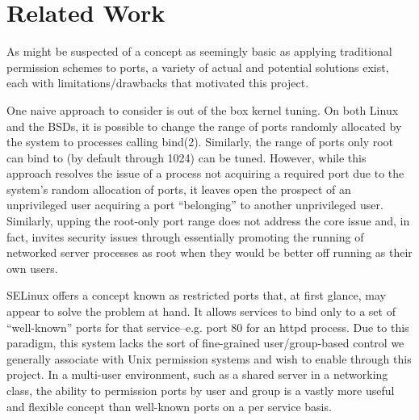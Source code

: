 \documentclass{sig-alternate}
\begin{document}
\section{Related Work}
As might be suspected of a concept as seemingly basic as applying traditional permission schemes to ports, a variety of actual and potential solutions exist, each with limitations/drawbacks that motivated this project. 

	One naive approach to consider is out of the box kernel tuning. On both Linux and the BSDs, it is possible to change the range of ports randomly allocated by the system to processes calling bind(2). Similarly, the range of ports only root can bind to (by default through 1024) can be tuned. However, while this approach resolves the issue of a process not acquiring a required port due to the system's random allocation of ports, it leaves open the prospect of an unprivileged user acquiring a port “belonging” to another unprivileged user. Similarly, upping the root-only port range does not address the core issue and, in fact, invites security issues through essentially promoting the running of networked server processes as root when they would be better off running as their own users.
	
	SELinux offers a concept known as restricted ports that, at first glance, may appear to solve the problem at hand. It allows services to bind only to a set of “well-known” ports for that service--e.g. port 80 for an httpd process. Due to this paradigm, this system lacks the sort of fine-grained user/group-based control we generally associate with Unix permission systems and wish to enable through this project. In a multi-user environment, such as a shared server in a networking class, the ability to permission ports by user and group is a vastly more useful and flexible concept than well-known ports on a per service basis. 
	
\end{document}
